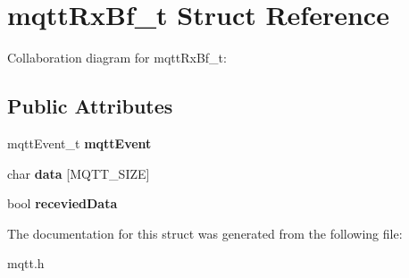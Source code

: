 \hypertarget{structmqttRxBf__t}{}\section{mqtt\+Rx\+Bf\+\_\+t Struct Reference}
\label{structmqttRxBf__t}


Collaboration diagram for mqtt\+Rx\+Bf\+\_\+t\+:
\subsection*{Public Attributes}
\begin{DoxyCompactItemize}
\item 
\mbox{\label{structmqttRxBf__t_af14afe6989fa691721b612eb6aea9a87}} 
mqtt\+Event\+\_\+t {\bfseries mqtt\+Event}
\item 
\mbox{\label{structmqttRxBf__t_a219c07affa381c0a3024ad757f14ed29}} 
char {\bfseries data} \mbox{[}M\+Q\+T\+T\+\_\+\+S\+I\+ZE\mbox{]}
\item 
\mbox{\label{structmqttRxBf__t_ab9e321c2fedce83b4720d93b5eeaacc7}} 
bool {\bfseries recevied\+Data}
\end{DoxyCompactItemize}


The documentation for this struct was generated from the following file\+:\begin{DoxyCompactItemize}
\item 
mqtt.\+h\end{DoxyCompactItemize}
